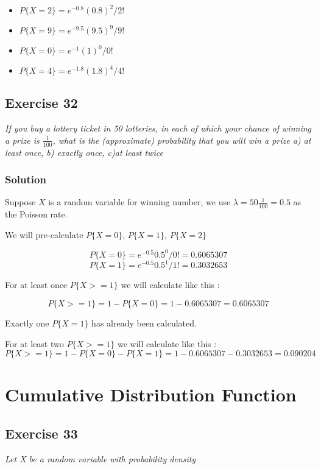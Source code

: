 \documentclass[12pt,a4paper]{article}
\begin{document}
\begin{itemize}
	\item $P\{X=2\} = e^{-0.8}(0.8)^{2}/2!$ 
	\item $P\{X=9\} = e^{-9.5}(9.5)^{9}/9!$
	\item $P\{X=0\} = e^{-1}(1)^{0}/0!$
	\item $P\{X=4\} = e^{-1.8}(1.8)^{4}/4!$
\end{itemize}

\subsection{Exercise 32}

\textit{If you buy a lottery ticket in 50 lotteries, in each of which your chance of winning a prize is $\frac{1}{100}$, what is the (approximate) probability that you will win a prize a) at least once, b) exactly once, c)at least twice}

\subsubsection{Solution}

Suppose $X$ is a random variable for winning number, we use $\lambda = 50 \frac{1}{100} = 0.5$ as the Poisson rate.

We will pre-calculate $P\{X=0\}$, $P\{X=1\}$, $P\{X=2\}$

\[
P\{X=0\} = e^{-0.5}{0.5}^{0}/0! = 0.6065307
\]
\[
P\{X=1\} = e^{-0.5}{0.5}^{1}/1! = 0.3032653
\]

For at least once $P\{X>=1\}$ we will calculate like this :

\[
P\{X>=1\} = 1 - P\{X=0\} = 1 - 0.6065307 = 0.6065307
\]

Exactly one $P\{X=1\}$ has already been calculated.

For at least two $P\{X>=1\}$ we will calculate like this :
\[
P\{X>=1\} = 1 - P\{X=0\} - P\{X=1\} = 1 - 0.6065307 - 0.3032653 = 0.090204
\]

\section{Cumulative Distribution Function}
\subsection{Exercise 33}

\textit{Let X be a random variable with probability density}
\end{document}
